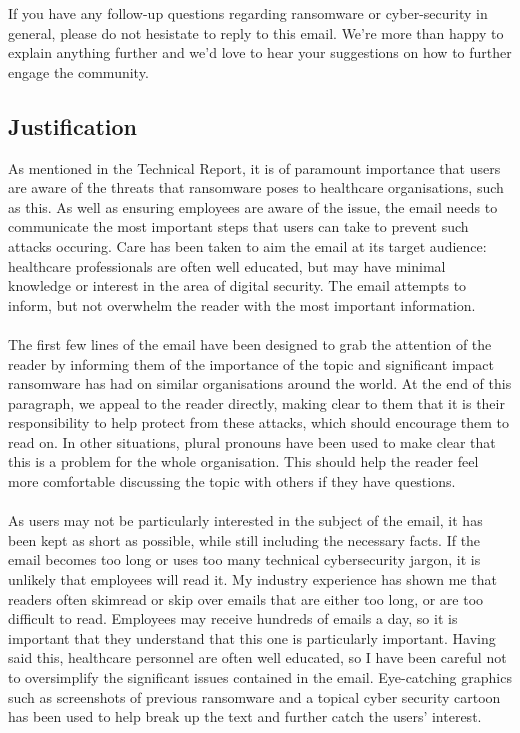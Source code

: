 \documentclass{article}
\begin{document}
If you have any follow-up questions regarding ransomware or cyber-security in general, please do not hesistate to reply to this email. We're more than happy to explain anything further and we'd love to hear your suggestions on how to further engage the community.

\subsection{Justification}%
As mentioned in the Technical Report, it is of paramount importance that users are aware of the threats that ransomware poses to healthcare organisations, such as this. As well as ensuring employees are aware of the issue, the email needs to communicate the most important steps that users can take to prevent such attacks occuring.
Care has been taken to aim the email at its target audience: healthcare professionals are often well educated, but may have minimal knowledge or interest in the area of digital security.
The email attempts to inform, but not overwhelm the reader with the most important information.
\\\\
The first few lines of the email have been designed to grab the attention of the reader by informing them of the importance of the topic and significant impact ransomware has had on similar organisations around the world.
At the end of this paragraph, we appeal to the reader directly, making clear to them that it is their responsibility to help protect from these attacks, which should encourage them to read on. In other situations, plural pronouns have been used to make clear that this is a problem for the whole organisation. This should help the reader feel more comfortable discussing the topic with others if they have questions.
\\\\
As users may not be particularly interested in the subject of the email, it has been kept as short as possible, while still including the necessary facts.
If the email becomes too long or uses too many technical cybersecurity jargon, it is unlikely that employees will read it. My industry experience has shown me that readers often skimread or skip over emails that are either too long, or are too difficult to read. Employees may receive hundreds of emails a day, so it is important that they understand that this one is particularly important. Having said this, healthcare personnel are often well educated, so I have been careful not to oversimplify the significant issues contained in the email. Eye-catching graphics such as screenshots of previous ransomware and a topical cyber security cartoon has been used to help break up the text and further catch the users' interest.
\end{document}
